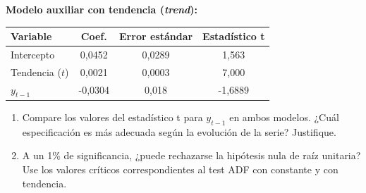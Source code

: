 \documentclass[12pt]{article}
\begin{document}
\begin{enumerate}
    \textbf{Modelo auxiliar con tendencia (\textit{trend}):}
    \begin{table}[H]
    \centering
    \begin{tabular}{lccc}
    \toprule
    Variable & Coef. & Error estándar & Estadístico t \\
    \midrule
    Intercepto & 0,0452 & 0,0289 & 1,563 \\
    Tendencia ($t$) & 0,0021 & 0,0003 & 7,000 \\
    $y_{t-1}$  & -0,0304 & 0,018 & -1,6889 \\
    \bottomrule
    \end{tabular}
    \end{table}

    \begin{enumerate}
        \item[d)] Compare los valores del estadístico t para \( y_{t-1} \) en ambos modelos. ¿Cuál especificación es más adecuada según la evolución de la serie? Justifique.
        \item[e)] A un 1\% de significancia, ¿puede rechazarse la hipótesis nula de raíz unitaria? Use los valores críticos correspondientes al test ADF con constante y con tendencia.
    \end{enumerate}

\end{enumerate}
\end{document}
